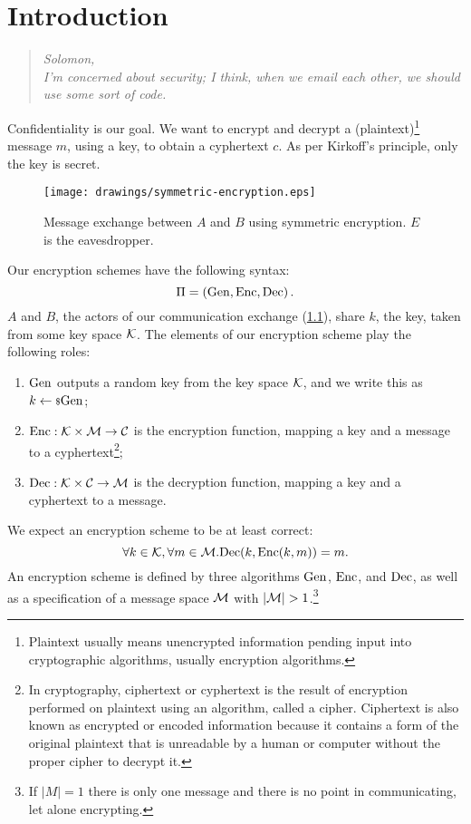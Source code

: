 \chapter{Introduction}

\begin{quote}
	\textit{Solomon,\\ I'm concerned about security; I think, when we email each other, we should use some sort of code.}
\end{quote}

Confidentiality is our goal.
We want to encrypt and decrypt a (plaintext)\footnote{Plaintext usually means unencrypted information pending input into cryptographic algorithms, usually encryption algorithms.} message $m$, using a key, to obtain a cyphertext $c$.
As per Kirkoff's principle, only the key is secret.

\begin{figure}[h]
	\centering
	\texttt{[image: drawings/symmetric-encryption.eps]}
	\caption{Message exchange between $A$ and $B$ using symmetric encryption. $E$ is the eavesdropper.}
	\label{fig:symmetric-encryption}
\end{figure}

Our encryption schemes have the following syntax:
\begin{equation*}
	\Pi = \left( \mathrm{Gen}, \allowbreak \mathrm{Enc}, \allowbreak \mathrm{Dec} \right).
\end{equation*}
$A$ and $B$, the actors of our communication exchange (\cref{fig:symmetric-encryption}), share $k$, the key, taken from some key space $\mathcal{K}$.
The elements of our encryption scheme play the following roles:
\begin{enumerate}
	\item $\mathrm{Gen}$ outputs a random key from the key space $\mathcal{K}$, and we write this as $k \leftarrow {\scriptstyle \$} {\mathrm{Gen}}$;
	\item $\mathrm{Enc} : \mathcal{K} \times \mathcal{M} \to \mathcal{C}$ is the encryption function, mapping a key and a message to a cyphertext\footnote{In cryptography, ciphertext or cyphertext is the result of encryption performed on plaintext using an algorithm, called a cipher. Ciphertext is also known as encrypted or encoded information because it contains a form of the original plaintext that is unreadable by a human or computer without the proper cipher to decrypt it.};
	\item $\mathrm{Dec} : \mathcal{K} \times \mathcal{C} \to \mathcal{M}$ is the decryption function, mapping a key and a cyphertext to a message.
\end{enumerate}
We expect an encryption scheme to be at least correct:
\begin{equation*}
	\forall k \in \mathcal{K}, \forall m \in \mathcal{M} . \mathrm{Dec}(k, \mathrm{Enc}(k, m)) = m.
\end{equation*}
An encryption scheme is defined by three algorithms $\mathrm{Gen}$, $\mathrm{Enc}$, and $\mathrm{Dec}$, as well as a specification of a message space $\mathcal{M}$ with $| \mathcal{M} | > 1$.\footnote{If $| M | = 1$ there is only one message and there is no point in communicating, let alone encrypting.}

